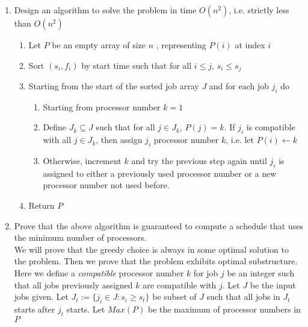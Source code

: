\documentclass[11pt]{article}
\begin{document}
\begin{enumerate}
  \item Design an algorithm to solve the problem in time $O(n^2)$, i.e. strictly less than $O(n^2)$\\
  \begin{enumerate}
    \item Let $P$ be an empty array of size $n$ , representing $P(i)$ at index $i$
    \item Sort $(s_i, f_i)$ by start time such that for all $i\leq j$, $s_i \leq s_j$
    \item Starting from the start of the sorted job array $J$ and for each job $j_i$ do
    \begin{enumerate}
      \item Starting from processor number $k = 1$
      \item Define $J_k\subseteq J$ such that for all $j\in J_k$, $P(j) = k$. If $j_i$ is compatible with all $j\in J_k$, then assign $j_i$ processor number $k$, i.e. let $P(i) \leftarrow k$
      \item Otherwise, increment $k$ and try the previous step again until $j_i$ is assigned to either a previously used processor number or a new processor number not used before.
    \end{enumerate}
    \item Return $P$
  \end{enumerate}

  \item Prove that the above algorithm is guaranteed to compute a schedule that uses the minimum number of processors.\\

  We will prove that the greedy choice is always in some optimal solution to the problem. Then we prove that the problem exhibits optimal substructure. Here we define a \textit{compatible} processor number $k$ for job $j$ be an integer such that all jobs previously assigned $k$ are compatible with $j$. Let $J$ be the input jobs given. Let $J_t := \{ j_i \in J: s_i \geq s_t\}$ be subset of $J$ such that all jobs in $J_t$ starts after $j_t$ starts. Let $Max(P)$ be the maximum of processor numbers in $P$



\end{enumerate}
\end{document}
